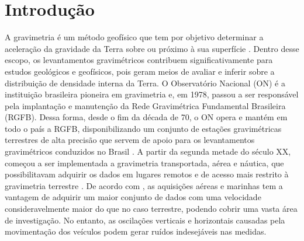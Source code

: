 \chapter{Introdução}

A gravimetria é um método geofísico que tem por objetivo determinar a aceleração da gravidade da Terra sobre ou próximo à sua superfície \cite{torge1989}. Dentro desse escopo, os levantamentos gravimétricos contribuem significativamente para estudos geológicos e geofísicos, pois geram meios de avaliar e inferir sobre a distribuição de densidade interna da Terra. O Observatório Nacional (ON) é a instituição brasileira pioneira em gravimetria e, em 1978, passou a ser responsável pela implantação e manutenção da Rede Gravimétrica Fundamental Brasileira (RGFB). Dessa forma, desde o fim da década de 70, o ON opera e mantém em todo o país a RGFB, disponibilizando um conjunto de estações gravimétricas terrestres de alta precisão que servem de apoio para os levantamentos gravimétricos conduzidos no Brasil \cite{escobar1987rede,subiza2001,castro2018}. A partir da segunda metade do século XX, começou a ser implementada a gravimetria transportada, aérea e náutica, que possibilitavam adquirir os dados em lugares remotos e de acesso mais restrito à gravimetria terrestre \cite{halpenny1995airborne,bell1999airborne}. De acordo com , as aquisições aéreas e marinhas tem a vantagem de adquirir um maior conjunto de dados com uma velocidade consideravelmente maior do que no caso terrestre, podendo cobrir uma vasta área de investigação. No entanto, as oscilações verticais e horizontais causadas pela movimentação dos veículos podem gerar ruídos indesejáveis nas medidas. 

